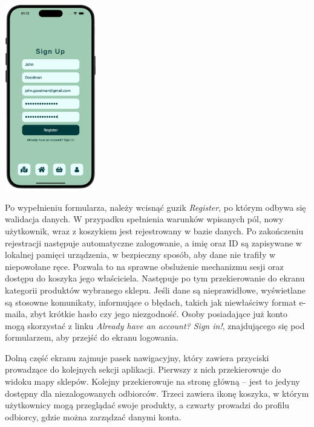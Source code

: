 \begin{center} 
    \includegraphics[width=0.3\textwidth]{images/front/register_page.png}
\end{center}

Po wypełnieniu formularza, należy wcisnąć guzik \textit{Register}, po którym odbywa się walidacja danych. W przypadku spełnienia warunków wpisanych pól, nowy użytkownik, wraz z koszykiem jest rejestrowany w bazie danych. Po zakończeniu rejestracji następuje automatyczne zalogowanie, a imię oraz ID są zapisywane w lokalnej pamięci urządzenia, w bezpieczny sposób, aby dane nie trafiły w niepowołane ręce. Pozwala to na sprawne obslużenie mechanizmu sesji oraz dostępu do koszyka jego właściciela. Następuje po tym przekierowanie do ekranu kategorii produktów wybranego sklepu. Jeśli dane są nieprawidłowe, wyświetlane są stosowne komunikaty, informujące o błędach, takich jak niewłaściwy format e-maila, zbyt krótkie hasło czy jego niezgodność. Osoby posiadające już konto mogą skorzystać z linku \textit{Already have an account? Sign in!}, znajdującego się pod formularzem, aby przejść do ekranu logowania. 

Dolną część ekranu zajmuje pasek nawigacyjny, który zawiera przyciski prowadzące do kolejnych sekcji aplikacji. Pierwszy z nich przekierowuje do widoku mapy sklepów. Kolejny przekierowuje na stronę główną – jest to jedyny dostępny dla niezalogowanych odbiorców. Trzeci zawiera ikonę koszyka, w którym użytkownicy mogą przeglądać swoje produkty, a czwarty prowadzi do profilu odbiorcy, gdzie można zarządzać danymi konta.

